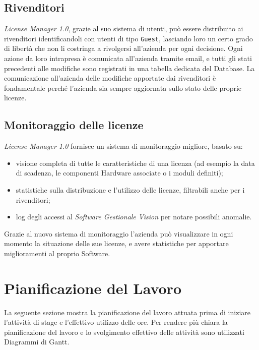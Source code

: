 \subsection{Rivenditori}

\textit{License Manager 1.0}, grazie al suo sistema di utenti, può essere distribuito ai rivenditori identificandoli con utenti di tipo \texttt{Guest}, lasciando loro un certo grado di libertà che non li costringa a rivolgersi all’azienda per ogni decisione. Ogni azione da loro intrapresa è comunicata all’azienda tramite email, e tutti gli stati precedenti alle modifiche sono registrati in una tabella dedicata del Database. La comunicazione all'azienda delle modifiche apportate dai rivenditori è fondamentale perché l'azienda sia sempre aggiornata sullo stato delle proprie licenze.

\subsection{Monitoraggio delle licenze}

\textit{License Manager 1.0} fornisce un sistema di monitoraggio migliore, basato su:
\begin{itemize}
\item visione completa di tutte le caratteristiche di una licenza (ad esempio la data di scadenza, le componenti Hardware associate o i moduli definiti);
\item statistiche sulla distribuzione e l'utilizzo delle licenze, filtrabili anche per i rivenditori;
\item log degli accessi al \textit{Software Gestionale Vision} per notare possibili anomalie.
\end{itemize}
Grazie al nuovo sistema di monitoraggio l'azienda può visualizzare in ogni momento la situazione delle sue licenze, e avere statistiche per apportare miglioramenti al proprio Software.


\newpage
\section{Pianificazione del Lavoro}

La seguente sezione mostra la pianificazione del lavoro attuata prima di iniziare l'attività di stage e l'effettivo utilizzo delle ore. Per rendere più chiara la pianificazione del lavoro e lo svolgimento effettivo delle attività sono utilizzati Diagrammi di Gantt.

